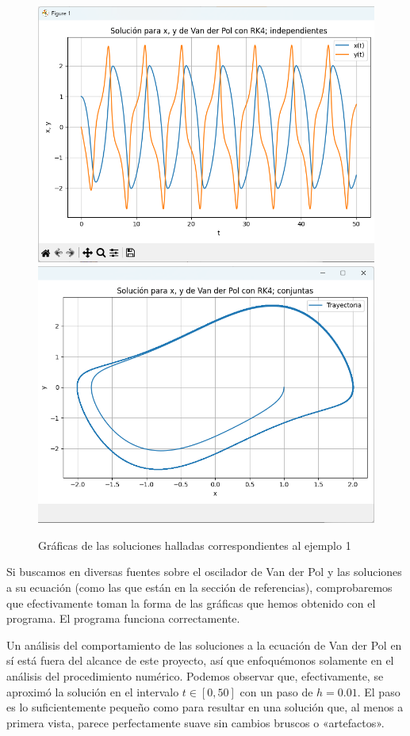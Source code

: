 \documentclass[12pt, a4paper]{article}
\begin{document}
\begin{figure}[H]\label{fig:ej1}
	\centering
	\includegraphics[scale=0.5]{../auxiliary/assets/ejemplo1-indiv.png}
	\includegraphics[scale=0.5]{../auxiliary/assets/ejemplo1-conj.png}
	\caption{Gráficas de las soluciones halladas correspondientes al ejemplo 1}
\end{figure}
Si buscamos en diversas fuentes sobre el oscilador de Van der Pol y las soluciones a su ecuación (como las que están en la sección de referencias), comprobaremos que efectivamente toman la forma de las gráficas que hemos obtenido con el programa. El programa funciona correctamente.

Un análisis del comportamiento de las soluciones a la ecuación de Van der Pol en sí está fuera del alcance de este proyecto, así que enfoquémonos solamente en el análisis del procedimiento numérico. Podemos observar que, efectivamente, se aproximó la solución en el intervalo \(t \in [0, 50]\) con un paso de \(h = 0.01\). El paso es lo suficientemente pequeño como para resultar en una solución que, al menos a primera vista, parece perfectamente suave sin cambios bruscos o «artefactos».
\end{document}
